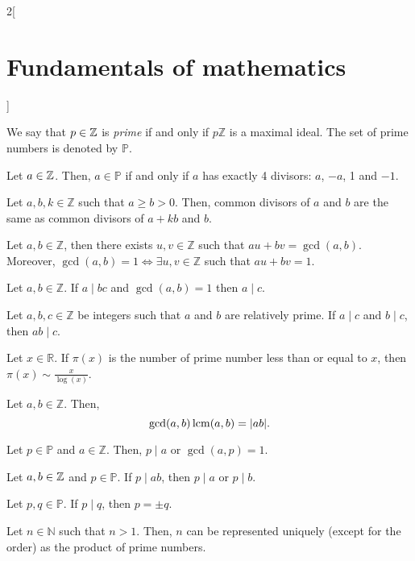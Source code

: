 \documentclass[../../../main.tex]{subfiles}
\begin{document}
\begin{multicols}{2}[\section{Fundamentals of mathematics}]
\begin{definition}
    We say that $p\in\mathbb{Z}$ is \emph{prime} if and only if $p\mathbb{Z}$ is a maximal ideal. The set of prime numbers is denoted by $\mathbb{P}$.
  \end{definition}
  \begin{prop}
    Let $a\in\mathbb{Z}$. Then, $a\in\mathbb{P}$ if and only if $a$ has exactly 4 divisors: $a$, $-a$, 1 and $-1$.
  \end{prop}
  \begin{lemma}
    Let $a,b,k\in\mathbb{Z}$ such that $a\geq b>0$. Then, common divisors of $a$ and $b$ are the same as common divisors of $a+kb$ and $b$.
  \end{lemma}
  \begin{theorem}
    Let $a,b\in\mathbb{Z}$, then there exists $u,v\in\mathbb{Z}$ such that $au+bv=\gcd(a,b)$. Moreover, $\gcd(a,b)=1\iff\exists u,v\in\mathbb{Z}$ such that $au+bv=1$.
  \end{theorem}
  \begin{theorem}
    Let $a,b\in\mathbb{Z}$. If $a\mid bc$ and $\gcd(a,b)=1$ then $a\mid c$.
  \end{theorem}
  \begin{corollary}
    Let $a,b,c\in\mathbb{Z}$ be integers such that $a$ and $b$ are relatively prime. If $a\mid c$ and $b\mid c$, then $ab\mid c$.
  \end{corollary}
  \begin{theorem}
    Let $x\in\mathbb{R}$. If $\pi(x)$ is the number of prime number less than or equal to $x$, then $\pi(x)\sim\frac{x}{\log(x)}$.
  \end{theorem}
  \begin{theorem}
    Let $a,b\in\mathbb{Z}$. Then, $$\gcd(a,b)\operatorname{lcm}(a,b)=|ab|.$$
  \end{theorem}
  \begin{lemma}
    Let $p\in\mathbb{P}$ and $a\in\mathbb{Z}$. Then, $p\mid a$ or $\gcd(a,p)=1$.
  \end{lemma}
  \begin{corollary}
    Let $a,b\in\mathbb{Z}$ and $p\in\mathbb{P}$. If $p\mid ab$, then $p\mid a$ or $p\mid b$.
  \end{corollary}
  \begin{corollary}
    Let $p,q\in\mathbb{P}$. If $p\mid q$, then $p=\pm q$.
  \end{corollary}
  \begin{theorem}
    Let $n\in\mathbb{N}$ such that $n>1$. Then, $n$ can be represented uniquely (except for the order) as the product of prime numbers.

\end{theorem}
\end{multicols}
\end{document}
